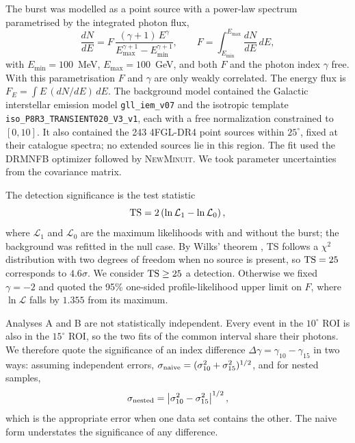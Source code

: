 The burst was modelled as a point source with a power-law spectrum parametrised by the integrated photon flux,
\begin{equation}
  \frac{dN}{dE} = F\,\frac{(\gamma + 1)\,E^{\gamma}}{E_{\max}^{\gamma+1} - E_{\min}^{\gamma+1}},
  \qquad
  F = \int_{E_{\min}}^{E_{\max}} \frac{dN}{dE}\,dE,
  \label{eq:pl2}
\end{equation}
with $E_{\min} = 100$~MeV, $E_{\max} = 100$~GeV, and both $F$ and the photon index $\gamma$ free. With this
parametrisation $F$ and $\gamma$ are only weakly correlated. The energy flux is
$F_E = \int E\,(dN/dE)\,dE$. The background model contained the Galactic interstellar emission model
\texttt{gll\_iem\_v07} and the isotropic template \texttt{iso\_P8R3\_TRANSIENT020\_V3\_v1}, each with a free
normalization constrained to $[0, 10]$. It also contained the 243 4FGL-DR4 point sources \citep{Abdollahi2022,
Ballet2023} within $25^\circ$, fixed at their catalogue spectra; no extended sources lie in this region. The fit
used the DRMNFB optimizer followed by \textsc{NewMinuit}. We took parameter uncertainties from the covariance matrix.

The detection significance is the test statistic
\begin{equation}
  {\rm TS} = 2\left(\ln\mathcal{L}_1 - \ln\mathcal{L}_0\right),
  \label{eq:ts}
\end{equation}
where $\mathcal{L}_1$ and $\mathcal{L}_0$ are the maximum likelihoods with and without the burst; the background was
refitted in the null case. By Wilks' theorem \citep{Wilks1938}, TS follows a $\chi^2$ distribution with two degrees
of freedom when no source is present, so ${\rm TS} = 25$ corresponds to $4.6\sigma$. We consider ${\rm TS} \ge 25$
a detection. Otherwise we fixed $\gamma = -2$ and quoted the 95\% one-sided profile-likelihood upper limit on $F$,
where $\ln\mathcal{L}$ falls by $1.355$ from its maximum.

Analyses A and B are not statistically independent. Every event in the $10^\circ$ ROI is also in the $15^\circ$
ROI, so the two fits of the common interval share their photons. We therefore quote the significance of an index
difference $\Delta\gamma = \gamma_{10} - \gamma_{15}$ in two ways: assuming independent errors,
$\sigma_{\rm naive} = (\sigma_{10}^2 + \sigma_{15}^2)^{1/2}$, and for nested samples,
\begin{equation}
  \sigma_{\rm nested} = \left|\sigma_{10}^2 - \sigma_{15}^2\right|^{1/2},
  \label{eq:nested}
\end{equation}
which is the appropriate error when one data set contains the other. The naive form understates the significance
of any difference.

